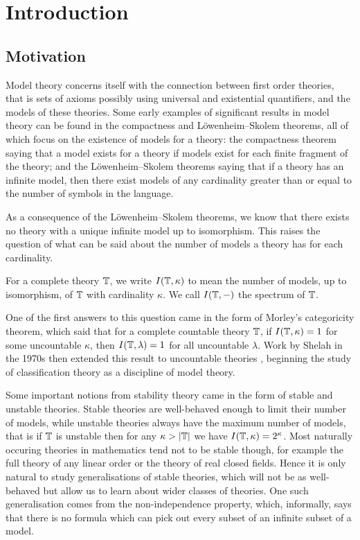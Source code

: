 \section{Introduction}%
\label{sec:introduction}

\subsection{Motivation}%
\label{sub:motivation}

Model theory concerns itself with the connection between first order theories, that is
sets of axioms possibly using universal and existential quantifiers, and the models of these
theories. Some early examples of significant results in model theory can be found in the
compactness and Löwenheim–Skolem theorems, all of which focus on the existence of models for a
theory: the compactness theorem saying that a model exists for a theory if models
exist for each finite fragment of the theory; and the Löwenheim–Skolem theorems saying
that if a theory has an infinite model, then there exist models of any cardinality
greater than or equal to the number of symbols in the language.

As a consequence of the Löwenheim–Skolem theorems, we know that there exists no theory
with a unique infinite model up to isomorphism. This raises the question of what can
be said about the number of models a theory has for each cardinality.

\begin{defn}
  For a complete theory $\mathbb{T}$, we write $I(\mathbb{T}, \kappa)$ to mean the number of
  models, up to isomorphism, of $\mathbb{T}$ with cardinality $\kappa$. We call
  $I(\mathbb{T}, -)$ the spectrum of $\mathbb{T}$.
\end{defn}

One of the first answers to this question came in the form of Morley's categoricity
theorem, which said that for a complete countable theory $\mathbb{T}$, if $I(\mathbb{T},\kappa) = 1$ for
some uncountable $\kappa$, then $I(\mathbb{T},\lambda) = 1$ for all uncountable $\lambda$. \cite{10.2307/1994188}
Work by Shelah in the 1970s then extended this result to uncountable theories
\cite{Sh:31}, beginning the study of classification theory as a discipline of model theory.

Some important notions from stability theory came in the form of stable and unstable theories.
Stable theories are well-behaved enough to limit their number of models, while unstable theories
always have the maximum number of models, that is if $\mathbb{T}$ is unstable then
for any $\kappa > |\mathbb{T}|$ we have $I(\mathbb{T},\kappa) = 2^\kappa$. \cite{Sh:a}
Most naturally occuring
theories in mathematics tend not to be stable though, for example the full theory of any linear
order or the theory of real closed fields. Hence it is only natural to study generalisations of
stable theories, which will not be as well-behaved but allow us to learn about
wider classes of theories. One such generalisation comes from the non-independence
property, which, informally, says that there is no formula which can pick out every subset of
an infinite subset of a model.

